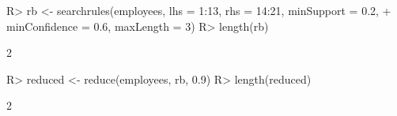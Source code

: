 \begin{Schunk}
% --begin: "reduce"
\begin{Sinput}
R> rb <- searchrules(employees, lhs = 1:13, rhs = 14:21, minSupport = 0.2, 
+      minConfidence = 0.6, maxLength = 3)
R> length(rb)
\end{Sinput}
\begin{Soutput}
[1] 2
\end{Soutput}
\begin{Sinput}
R> reduced <- reduce(employees, rb, 0.9)
R> length(reduced)
\end{Sinput}
\begin{Soutput}
[1] 2
\end{Soutput}
%
% --end: "reduce"
\end{Schunk}
